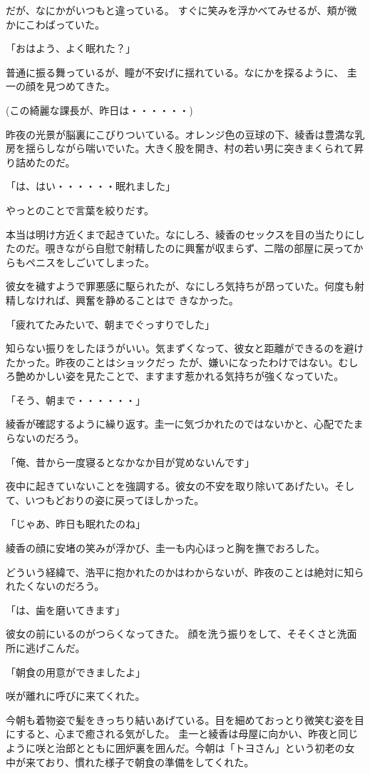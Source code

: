 ﻿\documentclass[book,tate]{jlreq}
\begin{document}
だが、なにかがいつもと違っている。 すぐに笑みを浮かべてみせるが、頬が微かにこわばっていた。

「おはよう、よく眠れた？」

普通に振る舞っているが、瞳が不安げに揺れている。なにかを探るように、 圭一の顔を見つめてきた。

(この綺麗な課長が、昨日は・・・・・・)

昨夜の光景が脳裏にこびりついている。オレンジ色の豆球の下、綾香は豊満な乳房を揺らしながら喘いでいた。大きく股を開き、村の若い男に突きまくられて昇り詰めたのだ。

「は、はい・・・・・・眠れました」

やっとのことで言葉を絞りだす。

本当は明け方近くまで起きていた。なにしろ、綾香のセックスを目の当たりにしたのだ。覗きながら自慰で射精したのに興奮が収まらず、二階の部屋に戻ってからもペニスをしごいてしまった。

彼女を穢すようで罪悪感に駆られたが、なにしろ気持ちが昂っていた。何度も射精しなければ、興奮を静めることはで きなかった。

「疲れてたみたいで、朝までぐっすりでした」

知らない振りをしたほうがいい。気まずくなって、彼女と距離ができるのを避けたかった。昨夜のことはショックだっ たが、嫌いになったわけではない。むしろ艶めかしい姿を見たことで、ますます惹かれる気持ちが強くなっていた。

「そう、朝まで・・・・・・」

綾香が確認するように繰り返す。圭一に気づかれたのではないかと、心配でたまらないのだろう。

「俺、昔から一度寝るとなかなか目が覚めないんです」

夜中に起きていないことを強調する。彼女の不安を取り除いてあげたい。そして、いつもどおりの姿に戻ってほしかった。

「じゃあ、昨日も眠れたのね」

綾香の顔に安堵の笑みが浮かび、圭一も内心ほっと胸を撫でおろした。

どういう経緯で、浩平に抱かれたのかはわからないが、昨夜のことは絶対に知られたくないのだろう。

「は、歯を磨いてきます」

彼女の前にいるのがつらくなってきた。 顔を洗う振りをして、そそくさと洗面所に逃げこんだ。

「朝食の用意ができましたよ」

咲が離れに呼びに来てくれた。

今朝も着物姿で髪をきっちり結いあげている。目を細めておっとり微笑む姿を目にすると、心まで癒される気がした。 圭一と綾香は母屋に向かい、昨夜と同じように咲と治郎とともに囲炉裏を囲んだ。今朝は「トヨさん」という初老の女 中が来ており、慣れた様子で朝食の準備をしてくれた。
\end{document}
